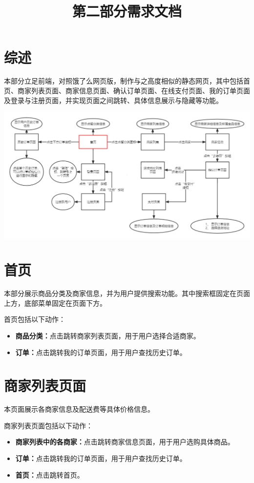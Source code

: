 \documentclass[UTF8]{ctexart}
\title{\vspace{-1.5cm}第二部分需求文档\vspace{-2em}}
\date{}
\begin{document}
\maketitle
\section{综述}
本部分立足前端，对照饿了么网页版，制作与之高度相似的静态网页，其中包括首页、商家列表页面、商家信息页面、确认订单页面、在线支付页面、我的订单页面及登录与注册页面，并实现页面之间跳转、具体信息展示与隐藏等功能。

\includegraphics[width=1\textwidth]{UML.png}

\section{首页}
本部分展示商品分类及商家信息，并为用户提供搜索功能。其中搜索框固定在页面上方，底部菜单固定在页面下方。

首页包括以下动作：
\begin{itemize}
    \item \textbf{商品分类：}点击跳转商家列表页面，用于用户选择合适商家。
    \item \textbf{订单：}点击跳转我的订单页面，用于用户查找历史订单。
\end{itemize}

\section{商家列表页面}
本页面展示各商家信息及配送费等具体价格信息。

商家列表页面包括以下动作：
\begin{itemize}
    \item \textbf{商家列表中的各商家：}点击跳转商家信息页面，用于用户选购具体商品。
    \item \textbf{订单：}点击跳转我的订单页面，用于用户查找历史订单。
    \item \textbf{首页：}点击跳转首页。
\end{itemize}
\end{document}
